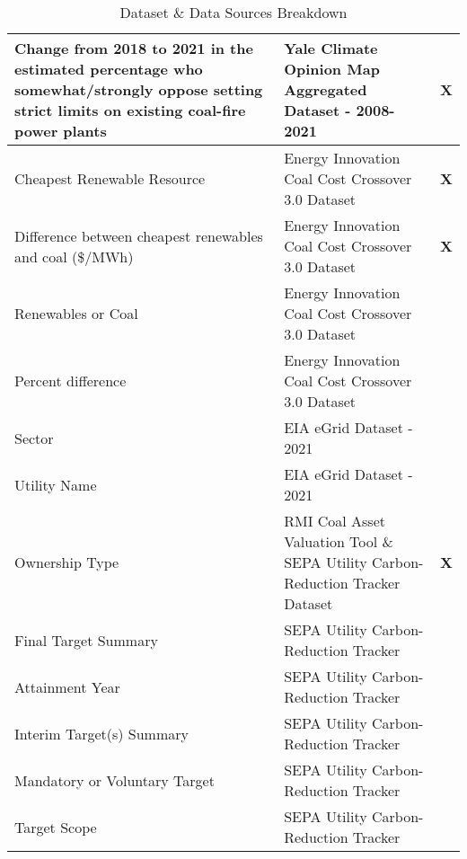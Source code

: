 \begin{table}[H]
\begin{adjustbox}{width=\textwidth}
\begin{tabular}{|l | l | l |}
        Change from 2018 to 2021 in the estimated percentage who somewhat/strongly oppose setting strict limits on existing coal-fire power plants & Yale Climate Opinion Map Aggregated Dataset - 2008-2021 & \textbf{X} \\
        \midrule
        Cheapest Renewable Resource & Energy Innovation Coal Cost Crossover 3.0 Dataset & \textbf{X} \\
        \midrule
        Difference between cheapest renewables and coal (\$/MWh) & Energy Innovation Coal Cost Crossover 3.0 Dataset & \textbf{X} \\
        \midrule
        Renewables or Coal & Energy Innovation Coal Cost Crossover 3.0 Dataset & \\
        \midrule
        Percent difference & Energy Innovation Coal Cost Crossover 3.0 Dataset & \\
        \midrule
        Sector & EIA eGrid Dataset - 2021 & \\
        \midrule
        Utility Name & EIA eGrid Dataset - 2021 & \ \\
        \midrule
        Ownership Type & RMI Coal Asset Valuation Tool \& SEPA Utility Carbon-Reduction Tracker Dataset & \textbf{X} \\
        \midrule
        Final Target Summary & SEPA Utility Carbon-Reduction Tracker & \\
        \midrule
        Attainment Year & SEPA Utility Carbon-Reduction Tracker & \\
        \midrule
        Interim Target(s) Summary & SEPA Utility Carbon-Reduction Tracker & \\
        \midrule
        Mandatory or Voluntary Target & SEPA Utility Carbon-Reduction Tracker & \\
        \midrule
        Target Scope & SEPA Utility Carbon-Reduction Tracker & \\
        \bottomrule
      \end{tabular}
    \end{adjustbox}
    \caption{Dataset \& Data Sources Breakdown}
  \end{table}


